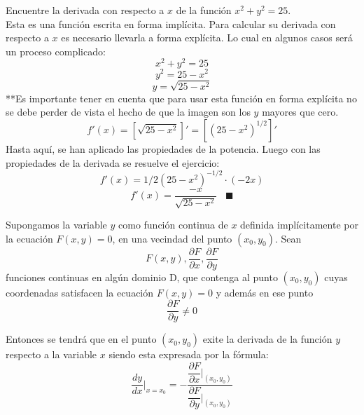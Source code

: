 \documentclass[10pt,twoside]{SelfArx} %
\begin{document}
\begin{ejemplo}
Encuentre la derivada con respecto a $ x $ de la función $ x^{2}+y^{2}=25 $.\\
Esta es una función escrita en forma implícita. Para calcular su derivada con respecto a $ x $ es necesario llevarla a forma explícita. Lo cual en algunos casos será un proceso complicado:
\begin{equation}
 x^{2}+y^{2}=25 
\end{equation}
\begin{equation}
 y^{2}=25-x^{2} 
\end{equation}
\begin{equation}
 y=\sqrt{25-x^{2}} 
\end{equation}
**Es importante tener en cuenta que para usar esta función en forma explícita no se debe perder de vista el hecho de que la imagen son los $ y $ mayores que cero.
\begin{equation}
 f'(x)=\left[\sqrt{25-x^{2}}\right ]'=\left[(25-x^{2})^{1/2}\right]' 
\end{equation}
Hasta aquí, se han aplicado las propiedades de la potencia. Luego con las propiedades de la derivada se resuelve el ejercicio:
\begin{equation}
 f'(x)=1/2(25-x^{2})^{-1/2}\cdot (-2x) 
\end{equation}
\begin{equation}
 f'(x)=\frac{-x}{\sqrt{25-x^{2}}} \;\;\; \blacksquare 
\end{equation}

\end{ejemplo}
 
\begin{teorema}
Supongamos la variable $ y $ como función continua de $ x $ definida implícitamente por la ecuación $ F(x,y)=0 $, en una vecindad del punto $ (x_{0}, y_{0}). $ Sean 
\begin{equation}
 F(x,y), \dfrac{\partial F}{\partial x}, \dfrac{\partial F}{\partial y} 
\end{equation}
funciones continuas en algún dominio D, que contenga al punto $ (x_{0}, y_{0}) $ cuyas coordenadas satisfacen la ecuación $ F(x,y)=0 $ y además en ese punto
\begin{equation}
  \dfrac{\partial F}{\partial y}\neq0  
\end{equation}

Entonces se tendrá que en el punto $ (x_{0}, y_{0}) $ exite la derivada de la función $ y $ respecto a la variable $ x $ siendo esta expresada por la fórmula:
\begin{equation}\label{funcion_implicita}
 \frac{dy}{dx}\Bigg|_{x=x_{0}}=-\dfrac{\dfrac{\partial F}{\partial x}\Bigg|_{(x_{0}, y_{0})}}{\dfrac{\partial F}{\partial y}\Bigg|_{(x_{0}, y_{0})}} 
\end{equation}
	
\end{teorema}
\end{document}
